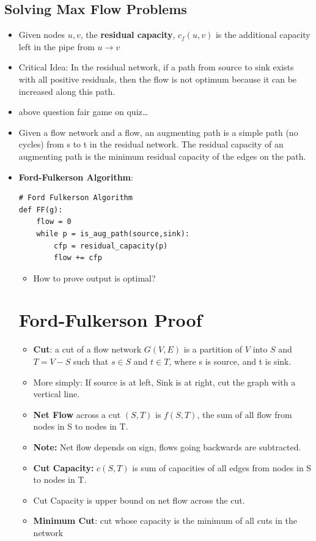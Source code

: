 \documentclass[12pt, letter]{article}
\begin{document}
\subsection*{Solving Max Flow Problems}
\begin{itemize}
	\item Given nodes $u,v$, the \textbf{residual capacity}, $c_f(u,v)$ is the additional capacity left in the pipe from $u \to v$
	\item Critical Idea: In the residual network, if a path from source to sink exists with all positive residuals, then the flow is not optimum because it can be increased along this path.
	\item above question fair game on quiz\ldots
	\item Given a flow network and a flow, an augmenting path is a simple path (no cycles) from s to t in the residual network. The residual capacity of an augmenting path is the minimum residual capacity of the edges on the path.
	\item \textbf{Ford-Fulkerson Algorithm}:
\begin{verbatim}
# Ford Fulkerson Algorithm
def FF(g):
    flow = 0
    while p = is_aug_path(source,sink):
        cfp = residual_capacity(p)
        flow += cfp
\end{verbatim}
\begin{itemize}
    \item How to prove output is optimal?
\end{itemize}

\section{Ford-Fulkerson Proof}%
\label{sec:ford_fulkerson_proof}
\begin{itemize}
    \item \textbf{Cut}: a cut of a flow network $G(V,E)$ is a partition of $V$ into $S$ and $T=V-S$ such that $s\in S$ and $t\in T$, where s is source, and t is sink.
    \item More simply: If source is at left, Sink is at right, cut the graph with a vertical line.
    \item \textbf{Net Flow} across a cut $(S,T)$ is  $f(S,T)$, the sum of all flow from nodes in S to nodes in T.
    \item \textbf{Note:} Net flow depends on sign, flows going backwards are subtracted.
    \item \textbf{Cut Capacity:} $c(S,T)$ is sum of capacities of all edges from nodes in S to nodes in T.
    \item Cut Capacity is upper bound on net flow across the cut.
    \item \textbf{Minimum Cut}: cut whose capacity is the minimum of all cuts in the network
\end{itemize}

\end{itemize}
\end{document}
